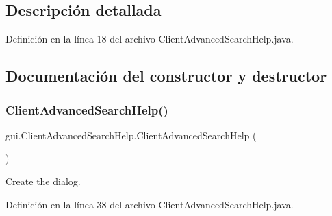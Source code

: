\subsection{Descripción detallada}


Definición en la línea 18 del archivo Client\+Advanced\+Search\+Help.\+java.



\subsection{Documentación del constructor y destructor}
\mbox{\label{classgui_1_1_client_advanced_search_help_afec1b2d3d9d873fbb409edab3aef1742}} 
\subsubsection{\texorpdfstring{ClientAdvancedSearchHelp()}{ClientAdvancedSearchHelp()}}
{\footnotesize\ttfamily gui.\+Client\+Advanced\+Search\+Help.\+Client\+Advanced\+Search\+Help (\begin{DoxyParamCaption}{ }\end{DoxyParamCaption})}



Create the dialog. 



Definición en la línea 38 del archivo Client\+Advanced\+Search\+Help.\+java.


